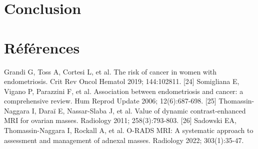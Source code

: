 \documentclass[11pt,a4paper]{article}
\begin{document}
\section{Conclusion}
\section{Références}
\noindent [23] Grandi G, Toss A, Cortesi L, et al. The risk of cancer in women with endometriosis. Crit Rev Oncol Hematol 2019; 144:102811. [24] Somigliana E, Vigano P, Parazzini F, et al. Association between endometriosis and cancer: a comprehensive review. Hum Reprod Update 2006; 12(6):687-698. [25] Thomassin-Naggara I, Daraï E, Nassar-Slaba J, et al. Value of dynamic contrast-enhanced MRI for ovarian masses. Radiology 2011; 258(3):793-803. [26] Sadowski EA, Thomassin-Naggara I, Rockall A, et al. O-RADS MRI: A systematic approach to assessment and management of adnexal masses. Radiology 2022; 303(1):35-47.\\
\end{document}
